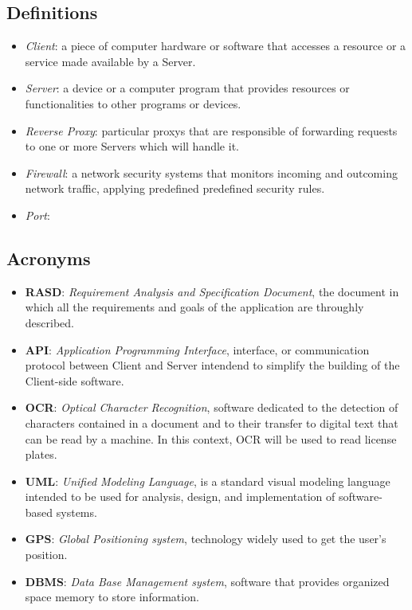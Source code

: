 \documentclass{report}
\begin{document}
\subsection{Definitions}
\begin{itemize}
    \item \textit{Client}: a piece of computer hardware or software that accesses a resource or a service made available by a Server.
    \item \textit{Server}: a device or a computer program that provides resources or functionalities to other programs or devices.
    \item \textit{Reverse Proxy}: particular proxys that are responsible of forwarding requests to one or more Servers which will handle it.
    \item \textit{Firewall}: a network security systems that monitors incoming and outcoming network traffic, applying predefined predefined security rules.
    \item \textit{Port}: %
\end{itemize}
\subsection{Acronyms}
\begin{itemize}
    \item \textbf{RASD}: \textit{Requirement Analysis and Specification Document}, the document in which all the requirements and goals of the application are throughly described.
    \item \textbf{API}: \textit{Application Programming Interface}, interface, or communication protocol between Client and Server intendend to simplify the building of the Client-side software.
    \item \textbf{OCR}: \textit{Optical Character Recognition}, software dedicated to the detection of characters contained in a document and to their transfer to digital text that can be read by a machine. In this context, OCR will be used to read license plates.
    \item \textbf{UML}: \textit{Unified Modeling Language}, is a standard visual modeling language intended to be used for analysis, design, and implementation of software-based systems.
    \item \textbf{GPS}: \textit{Global Positioning system}, technology widely used to get the user's position.
    \item \textbf{DBMS}: \textit{Data Base Management system}, software that provides organized space memory to store information.
    \end{itemize}
\end{document}
